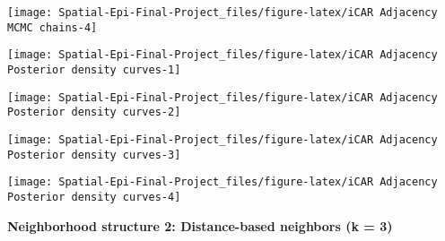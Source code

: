 \documentclass[]{article}
\begin{document}
\begin{center}\texttt{[image: Spatial-Epi-Final-Project\_files/figure-latex/iCAR Adjacency  MCMC chains-4]} \end{center}

\begin{center}\texttt{[image: Spatial-Epi-Final-Project\_files/figure-latex/iCAR Adjacency  Posterior density curves-1]} \end{center}

\begin{center}\texttt{[image: Spatial-Epi-Final-Project\_files/figure-latex/iCAR Adjacency  Posterior density curves-2]} \end{center}

\begin{center}\texttt{[image: Spatial-Epi-Final-Project\_files/figure-latex/iCAR Adjacency  Posterior density curves-3]} \end{center}

\begin{center}\texttt{[image: Spatial-Epi-Final-Project\_files/figure-latex/iCAR Adjacency  Posterior density curves-4]} \end{center}

\textbf{Neighborhood structure 2: Distance-based neighbors (k = 3)}
\end{document}
